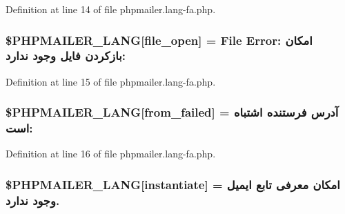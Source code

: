 Definition at line 14 of file phpmailer.\+lang-\/fa.\+php.

\subsubsection[{\texorpdfstring{\$\+P\+H\+P\+M\+A\+I\+L\+E\+R\+\_\+\+L\+A\+NG}{$PHPMAILER_LANG}}]{\setlength{\rightskip}{0pt plus 5cm}\$P\+H\+P\+M\+A\+I\+L\+E\+R\+\_\+\+L\+A\+NG\mbox{[}\textquotesingle{}file\+\_\+open\textquotesingle{}\mbox{]} = \textquotesingle{}File Error\+: امکان بازکردن فایل وجود ندارد\+: \textquotesingle{}}\hypertarget{phpmailer_8lang-fa_8php_a28d1a6517bf4c942a0ddd506188ad2e0}{}\label{phpmailer_8lang-fa_8php_a28d1a6517bf4c942a0ddd506188ad2e0}


Definition at line 15 of file phpmailer.\+lang-\/fa.\+php.

\subsubsection[{\texorpdfstring{\$\+P\+H\+P\+M\+A\+I\+L\+E\+R\+\_\+\+L\+A\+NG}{$PHPMAILER_LANG}}]{\setlength{\rightskip}{0pt plus 5cm}\$P\+H\+P\+M\+A\+I\+L\+E\+R\+\_\+\+L\+A\+NG\mbox{[}\textquotesingle{}from\+\_\+failed\textquotesingle{}\mbox{]} = \textquotesingle{}آدرس فرستنده اشتباه است\+: \textquotesingle{}}\hypertarget{phpmailer_8lang-fa_8php_adf832ae12155a09be077c6d5e4fd7e22}{}\label{phpmailer_8lang-fa_8php_adf832ae12155a09be077c6d5e4fd7e22}


Definition at line 16 of file phpmailer.\+lang-\/fa.\+php.

\subsubsection[{\texorpdfstring{\$\+P\+H\+P\+M\+A\+I\+L\+E\+R\+\_\+\+L\+A\+NG}{$PHPMAILER_LANG}}]{\setlength{\rightskip}{0pt plus 5cm}\$P\+H\+P\+M\+A\+I\+L\+E\+R\+\_\+\+L\+A\+NG\mbox{[}\textquotesingle{}instantiate\textquotesingle{}\mbox{]} = \textquotesingle{}امکان معرفی تابع ایمیل وجود ندارد.\textquotesingle{}}\hypertarget{phpmailer_8lang-fa_8php_ad58dde16780f4770ccf4dd282ea1f5ad}{}\label{phpmailer_8lang-fa_8php_ad58dde16780f4770ccf4dd282ea1f5ad}


